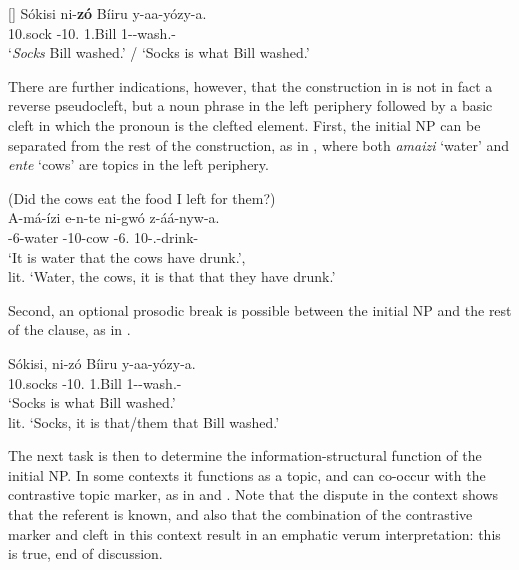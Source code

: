 \documentclass[output=paper]{langscibook}
\begin{document}
\ex
[]{
\label{bkm:Ref98947401:c}
\gll
Sókisi  ni-\textbf{zó}  Bíiru  y-aa-yózy-a.\\
10.sock  \COP{}-10.\PRO{}  1.Bill  1\SM{}-\PST{}-wash.\CAUS{}-\FV{}\\
\glt
‘\textit{Socks} Bill washed.’ / ‘Socks is what Bill washed.’\\
}


\z
\z

There are further indications, however, that the construction in  is not in fact a reverse pseudocleft, but a noun phrase in the left periphery followed by a basic cleft in which the pronoun is the clefted element. First, the initial NP can be separated from the rest of the construction, as in , where both \textit{amaizi} ‘water’ and \textit{ente} ‘cows’ are topics in the left periphery.

\ea
\label{bkm:Ref98947671}
(Did the cows eat the food I left for them?)\\
\gll
A-má-ízi  e-n-te  ni-gwó  z-áá-nyw-a.\\
\AUG{}-6-water  \AUG{}-10-cow  \COP{}-6.\PRO{}  10\SM{}-\N{}.\PST{}-drink-\FV{}\\
\glt
‘It is water that the cows have drunk.’, \\
lit. ‘Water, the cows, it is that that they have drunk.’\\

\z


Second, an optional prosodic break is possible between the initial NP and the rest of the clause, as in .

\ea
\label{bkm:Ref111495005}
\gll
Sókisi,  ni-zó  Bíiru  y-aa-yózy-a.\\
10.socks  \COP{}-10.\PRO{}  1.Bill  1\SM{}-\PST{}-wash.\CAUS{}-\FV{}\\
\glt
‘Socks is what Bill washed.’\\
lit. ‘Socks, it is that/them that Bill washed.’


\z


The next task is then to determine the information-structural function of the initial NP. In some contexts it functions as a topic, and can co-occur with the contrastive topic marker, as in  and . Note that the dispute in the context shows that the referent is known, and also that the combination of the contrastive marker and cleft in this context result in an emphatic verum interpretation: this is true, end of discussion.
\end{document}
